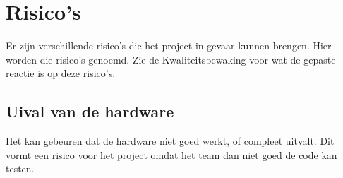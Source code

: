 \chapter{Risico's}
	Er zijn verschillende risico's die het project in gevaar kunnen brengen. Hier worden die risico's genoemd.
	Zie de Kwaliteitsbewaking voor wat de gepaste reactie is op deze risico's.
	\section{Uival van de hardware}
		Het kan gebeuren dat de hardware niet goed werkt, of compleet uitvalt.
		Dit vormt een risico voor het project omdat het team dan niet goed de code kan testen.
